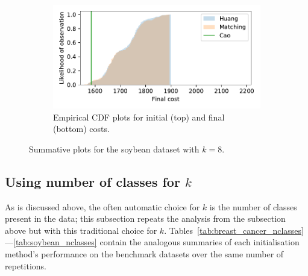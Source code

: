 \documentclass[smallextended]{svjour3}
\begin{document}
\begin{figure}
\begin{subfigure}{.5\textwidth}
        \includegraphics[width=\linewidth]{Fig4b2.pdf}
        \caption{Empirical CDF plots for initial (top) and final (bottom)
                 costs.}
    \end{subfigure}
    \caption{Summative plots for the soybean dataset with \(k=8\).}%
    \label{fig:soybean_knee}
\end{figure}


\subsection{Using number of classes for \(k\)}\label{subsec:nclasses}

As is discussed above, the often automatic choice for \(k\) is the number of
classes present in the data; this subsection repeats the analysis from the
subsection above but with this traditional choice for \(k\).
Tables~\ref{tab:breast_cancer_nclasses}---\ref{tab:soybean_nclasses}
contain the analogous summaries of each initialisation method's performance on
the benchmark datasets over the same number of repetitions.
\end{document}
